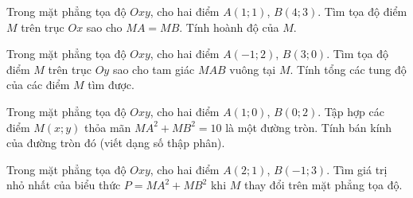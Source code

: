 \begin{bt}%
Trong mặt phẳng tọa độ $Oxy$, cho hai điểm $A(1;1)$, $B(4;3)$. Tìm tọa độ điểm $M$ trên trục $Ox$ sao cho $MA=MB$. Tính hoành độ của $M$.
\end{bt}

\begin{bt}%
Trong mặt phẳng tọa độ $Oxy$, cho hai điểm $A(-1;2)$, $B(3;0)$. Tìm tọa độ điểm $M$ trên trục $Oy$ sao cho tam giác $MAB$ vuông tại $M$. Tính tổng các tung độ của các điểm $M$ tìm được.
\end{bt}

\begin{bt}%
Trong mặt phẳng tọa độ $Oxy$, cho hai điểm $A(1;0)$, $B(0;2)$. Tập hợp các điểm $M(x;y)$ thỏa mãn $MA^2+MB^2=10$ là một đường tròn. Tính bán kính của đường tròn đó (viết dạng số thập phân).
\end{bt}

\begin{bt}%
Trong mặt phẳng tọa độ $Oxy$, cho hai điểm $A(2;1)$, $B(-1;3)$. Tìm giá trị nhỏ nhất của biểu thức $P=MA^2+MB^2$ khi $M$ thay đổi trên mặt phẳng tọa độ.
\end{bt}

